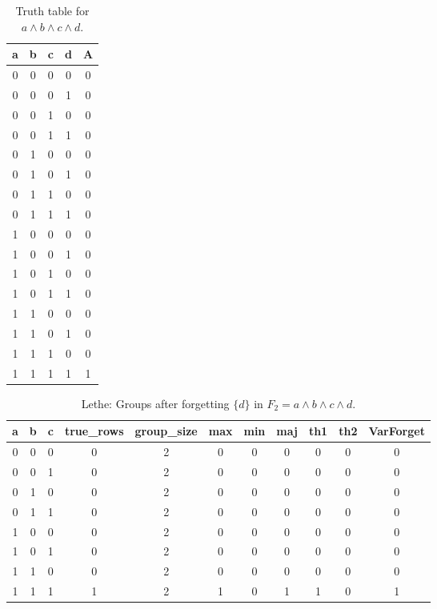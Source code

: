 \begin{table}[!tb]
    \centering
    \begin{tabular}{|c|c|c|c|c|}
        \hline
        \textbf{a} & \textbf{b} & \textbf{c} & \textbf{d} & \textbf{A} \\ \hline
        0 & 0 & 0 & 0 & 0 \\ \hline
        0 & 0 & 0 & 1 & 0 \\ \hline
        0 & 0 & 1 & 0 & 0 \\ \hline
        0 & 0 & 1 & 1 & 0 \\ \hline
        0 & 1 & 0 & 0 & 0 \\ \hline
        0 & 1 & 0 & 1 & 0 \\ \hline
        0 & 1 & 1 & 0 & 0 \\ \hline
        0 & 1 & 1 & 1 & 0 \\ \hline
        1 & 0 & 0 & 0 & 0 \\ \hline
        1 & 0 & 0 & 1 & 0 \\ \hline
        1 & 0 & 1 & 0 & 0 \\ \hline
        1 & 0 & 1 & 1 & 0 \\ \hline
        1 & 1 & 0 & 0 & 0 \\ \hline
        1 & 1 & 0 & 1 & 0 \\ \hline
        1 & 1 & 1 & 0 & 0 \\ \hline
        1 & 1 & 1 & 1 & 1 \\ \hline
    \end{tabular}
    \caption{Truth table for $a \land b \land c \land d$.}
    \label{tab:truthtab}
\end{table}

\begin{table}[!tb]
    \centering
    \begin{tabular}{|c|c|c|c|c|c|c|c|c|c|c|}
        \hline
        \textbf{a} & \textbf{b} & \textbf{c} & \textbf{true\_rows} & \textbf{group\_size} & \textbf{max} & \textbf{min} & \textbf{maj} & \textbf{th1} & \textbf{th2} & \textbf{VarForget} \\ \hline
        \rowcolor{gray!40} 0 & 0 & 0 & 0 & 2 & 0 & 0 & 0 & 0 & 0 & 0 \\ \hline
        \rowcolor{blue!40} 0 & 0 & 1 & 0 & 2 & 0 & 0 & 0 & 0 & 0 & 0 \\ \hline
        \rowcolor{red!40} 0 & 1 & 0 & 0 & 2 & 0 & 0 & 0 & 0 & 0 & 0 \\ \hline
        \rowcolor{green!40} 0 & 1 & 1 & 0 & 2 & 0 & 0 & 0 & 0 & 0 & 0 \\ \hline
        \rowcolor{yellow!40} 1 & 0 & 0 & 0 & 2 & 0 & 0 & 0 & 0 & 0 & 0 \\ \hline
        \rowcolor{gray!40} 1 & 0 & 1 & 0 & 2 & 0 & 0 & 0 & 0 & 0 & 0 \\ \hline
        \rowcolor{blue!40} 1 & 1 & 0 & 0 & 2 & 0 & 0 & 0 & 0 & 0 & 0 \\ \hline
        \rowcolor{red!40} 1 & 1 & 1 & 1 & 2 & 1 & 0 & 1 & 1 & 0 & 1 \\ \hline
    \end{tabular}
    \caption{Lethe: Groups after forgetting $\{d\}$ in $F_{2} = a \land b \land c \land d$.}
    \label{tab:lethe-F2-d-groups}
\end{table}

